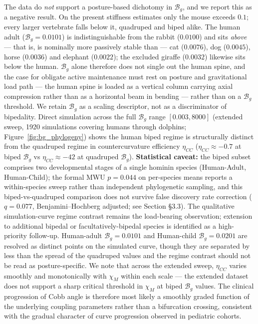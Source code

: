 The data do \emph{not} support a posture-based dichotomy in $\mathcal{B}_g$, and we report this as a negative result. On the present stiffness estimates only the mouse exceeds $0.1$; every larger vertebrate falls below it, quadruped and biped alike. The human adult ($\mathcal{B}_g = 0.0101$) is indistinguishable from the rabbit ($0.0100$) and sits \emph{above} --- that is, is nominally more passively stable than --- cat ($0.0076$), dog ($0.0045$), horse ($0.0036$) and elephant ($0.0022$); the excluded giraffe ($0.0032$) likewise sits below the human. $\mathcal{B}_g$ alone therefore does not single out the human spine, and the case for obligate active maintenance must rest on posture and gravitational load path --- the human spine is loaded as a vertical column carrying axial compression rather than as a horizontal beam in bending --- rather than on a $\mathcal{B}_g$ threshold. We retain $\mathcal{B}_g$ as a scaling descriptor, not as a discriminator of bipedality. Direct simulation across the full $\mathcal{B}_g$ range $[0.003, 8000]$ (extended sweep, 1920 simulations covering humans through dolphins; Figure~\ref{fig:bg_phylogeny}) shows the human biped regime is structurally distinct from the quadruped regime in countercurvature efficiency $\eta_{CC}$ ($\eta_{CC} \approx -0.7$ at biped $\mathcal{B}_g$ vs $\eta_{CC} \approx -42$ at quadruped $\mathcal{B}_g$). \textbf{Statistical caveat:} the biped subset comprises two developmental stages of a single hominin species (Human-Adult, Human-Child); the formal MWU $p=0.044$ on per-species means reports a within-species sweep rather than independent phylogenetic sampling, and this biped-vs-quadruped comparison does not survive false discovery rate correction ($q=0.077$, Benjamini--Hochberg adjusted; see Section §3.3). The qualitative simulation-curve regime contrast remains the load-bearing observation; extension to additional bipedal or facultatively-bipedal species is identified as a high-priority follow-up. Human-adult $\mathcal{B}_g = 0.0101$ and Human-child $\mathcal{B}_g = 0.0201$ are resolved as distinct points on the simulated curve, though they are separated by less than the spread of the quadruped values and the regime contrast should not be read as posture-specific. We note that across the extended sweep, $\eta_{CC}$ varies smoothly and monotonically with $\chi_M$ within each scale --- the extended dataset does not support a sharp critical threshold in $\chi_M$ at biped $\mathcal{B}_g$ values. The clinical progression of Cobb angle is therefore most likely a smoothly graded function of the underlying coupling parameters rather than a bifurcation crossing, consistent with the gradual character of curve progression observed in pediatric cohorts.

